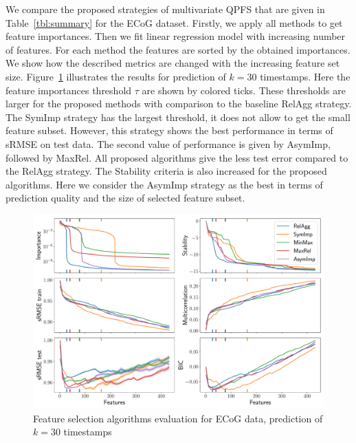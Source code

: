 \documentclass[12pt,twoside]{article}
\theoremstyle{definition}
\begin{document}
We compare the proposed strategies of multivariate QPFS that are given in Table~\ref{tbl:summary} for the ECoG dataset. 
Firstly, we apply all methods to get feature importances. 
Then we fit linear regression model with increasing number of features. 
For each method the features are sorted by the obtained importances. 
We show how the described metrics are changed with the increasing feature set size. 
Figure~\ref{fig:ecog_3_30_metrics} illustrates the results for prediction of $k = 30$ timestamps. 
Here the feature importances threshold $\tau$ are shown by colored ticks. 
These thresholds are larger for the proposed methods with comparison to the baseline RelAgg strategy. 
The SymImp strategy has the largest threshold, it does not allow to get the small feature subset.
However, this strategy shows the best performance in terms of sRMSE on test data.
The second value of performance is given by AsymImp, followed by MaxRel.
All proposed algorithms give the less test error compared to the RelAgg strategy. 
The Stability criteria is also increased for the proposed algorithms.
Here we consider the AsymImp strategy as the best in terms of prediction quality and the size of selected feature subset.

\begin{figure}[h]
	\includegraphics[width=\linewidth]{figs/ecog_3_30_metrics.pdf}
	\caption{Feature selection algorithms evaluation for ECoG data, prediction of $k = 30$ timestamps}
	\label{fig:ecog_3_30_metrics}
\end{figure}
\end{document}
